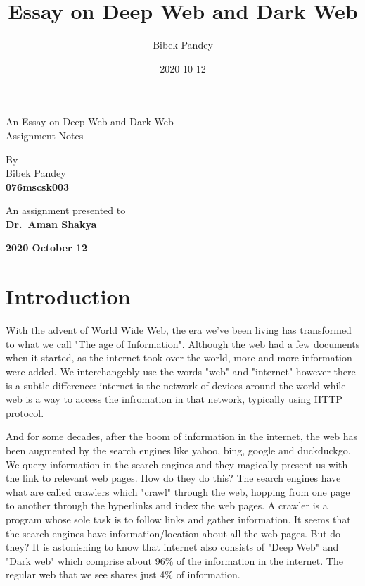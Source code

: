 \documentclass[12pt]{article}
\title{Essay on Deep Web and Dark Web}
\date{2020-10-12}
\author{Bibek Pandey}
\begin{document}
\begin{titlepage}
   \begin{center}
       \vspace*{1cm}

       {\huge An Essay on Deep Web and Dark Web} \\
       \vspace{0.5cm}
       Assignment Notes

       \vfill

       By \\
       \vspace{0.5cm}
       Bibek Pandey \\
       \textbf{076mscsk003}
       \vspace{1.5cm}

       \vfill

       An assignment presented to \\
       \vspace{0.3cm}
       \textbf{Dr.\ Aman Shakya}

       \vspace{1.5cm}
       \textbf{2020 October 12}

   \end{center}
\end{titlepage}

\section*{Introduction}
With the advent of World Wide Web, the era we've been living has transformed to
what we call "The age of Information". Although the web had a few documents
when it started, as the internet took over the world, more and more information
were added. We interchangebly use the words "web" and "internet"
however there is a subtle difference: internet is the network of devices around
the world while web is a way to access the infromation in that network,
typically using HTTP protocol.

And for some decades, after the boom of information in the internet, the web
has been augmented by the search engines like yahoo, bing, google and
duckduckgo. We query information in the search engines and they magically
present us with the link to relevant web pages. How do they do this? The search
engines have what are called crawlers which "crawl" through the web, hopping
from one page to another through the hyperlinks and index the web pages. A
crawler is a program whose sole task is to follow links and gather information.
It seems that the search engines have information/location about all the web
pages.
\newline But do they?
\newline It is astonishing to know that internet also consists of
"Deep Web" and "Dark web" which comprise about 96\% of the information in the
internet. The regular web that we see shares just 4\% of information.
\end{document}

